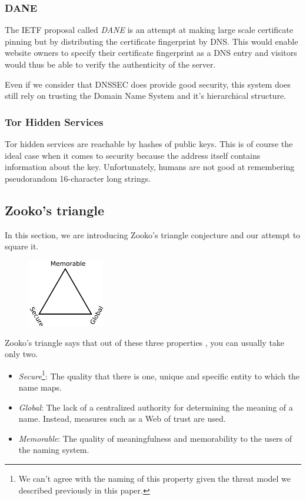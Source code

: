\documentclass{vldb}
\begin{document}
\subsubsection{DANE}

The IETF proposal called \emph{DANE} is an attempt at making large scale certificate pinning but by distributing the certificate fingerprint by DNS. This would enable website owners to specify their certificate fingerprint as a DNS entry and visitors would thus be able to verify the authenticity of the server.

Even if we consider that DNSSEC does provide good security, this system does still rely on trusting the Domain Name System and it's hierarchical structure.

\subsubsection{Tor Hidden Services}

Tor hidden services are reachable by hashes of public keys. This is of course the ideal case when it comes to security because the address itself contains information about the key. Unfortunately, humans are not good at remembering pseudorandom 16-character long strings.

\subsection{Zooko's triangle}
In this section, we are introducing Zooko's triangle conjecture and our attempt to square it.

\begin{figure}[h!]
\centering
\includegraphics[width=0.3\textwidth]{ZookoTriangle.png}
\end{figure}

Zooko's triangle says that out of these three properties \cite{zookoTriangleWikipedia}, you can usually take only two.
\begin{itemize}
\item \emph{Secure}\footnote{We can't agree with the naming of this property given the threat model we described previously in this paper.}: The quality that there is one, unique and specific entity to which the name maps.
\item \emph{Global}: The lack of a centralized authority for determining the meaning of a name. Instead, measures such as a Web of trust are used.
\item \emph{Memorable}: The quality of meaningfulness and memorability to the users of the naming system.
\end{itemize}
\end{document}
